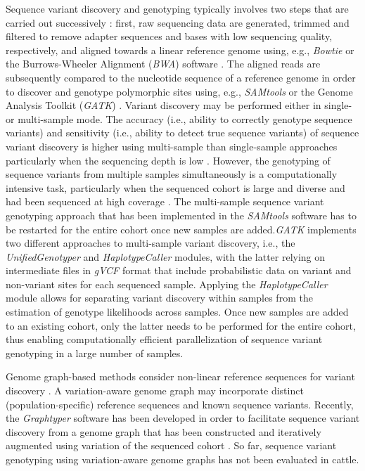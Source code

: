 \documentclass[../main.tex]{subfiles}
\begin{document}
Sequence variant discovery and genotyping typically involves two steps that are carried out successively \citep{nielsen2011genotype,guo2014three,goodwin2016coming,pfeifer2017next}: first, raw sequencing data are generated, trimmed and filtered to remove adapter sequences and bases with low sequencing quality, respectively, and aligned towards a linear reference genome using, e.g., \emph{Bowtie} \citep{langmead2012fast} or the Burrows-Wheeler Alignment (\emph{BWA}) software \citep{li2009fast}. The aligned reads are subsequently compared to the nucleotide sequence of a reference genome in order to discover and genotype polymorphic sites using, e.g., \emph{SAMtools} \citep{li2009sequence} or the Genome Analysis Toolkit (\emph{GATK}) \citep{mckenna2010genome,van2013fastq,poplin2018scaling}. Variant discovery may be performed either in single- or multi-sample mode. The accuracy (i.e., ability to correctly genotype sequence variants) and sensitivity (i.e., ability to detect true sequence variants) of sequence variant discovery is higher using multi-sample than single-sample approaches particularly when the sequencing depth is low \citep{liu2013variant,cheng2014assessing,baes2014evaluation,kumar2014evaluation,depristo2011framework}. However, the genotyping of sequence variants from multiple samples simultaneously is a computationally intensive task, particularly when the sequenced cohort is large and diverse and had been sequenced at high coverage \citep{poplin2018scaling}. The multi-sample sequence variant genotyping approach that has been implemented in the \emph{SAMtools} software has to be restarted for the entire cohort once new samples are added.\emph{GATK} implements two different approaches to multi-sample variant discovery, i.e., the \emph{UnifiedGenotyper} and \emph{HaplotypeCaller} modules, with the latter relying on intermediate files in \emph{gVCF} format that include probabilistic data on variant and non-variant sites for each sequenced sample. Applying the \emph{HaplotypeCaller} module allows for separating variant discovery within samples from the estimation of genotype likelihoods across samples. Once new samples are added to an existing cohort, only the latter needs to be performed for the entire cohort, thus enabling computationally efficient parallelization of sequence variant genotyping in a large number of samples.  

Genome graph-based methods consider non-linear reference sequences for variant discovery \citep{rakocevic2019fast,eggertsson2017graphtyper,novak2017genome,garrison2018variation,sibbesen2018accurate}. A variation-aware genome graph may incorporate distinct (population-specific) reference sequences and known sequence variants. Recently, the \emph{Graphtyper} software has been developed in order to facilitate sequence variant discovery from a genome graph that has been constructed and iteratively augmented using variation of the sequenced cohort \citep{eggertsson2017graphtyper}. So far, sequence variant genotyping using variation-aware genome graphs has not been evaluated in cattle.
\end{document}
